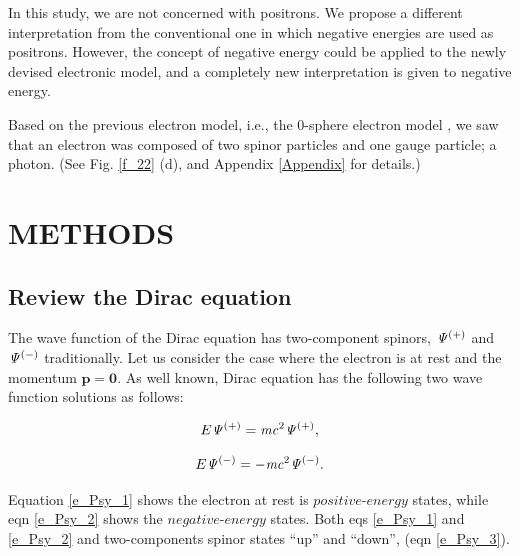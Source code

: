 \documentclass[%
 reprint,
 amsmath,amssymb,
 aps,
]{revtex4-1}
\numberwithin{equation}{section}%
\begin{document}
    
    In this study, we are not concerned with positrons. We propose a different interpretation from the conventional one in which negative energies are used as positrons. However, the concept of negative energy could be applied to the newly devised electronic model, and a completely new interpretation is given to negative energy.

    Based on the previous electron model, i.e., the 0-sphere electron model \cite{Hanamura1} \cite{Hanamura6}, we saw that an electron was composed of two spinor particles and one gauge particle; a photon. (See Fig. \ref{f_22} ($\bm{\mathrm{d}}$), and Appendix \ref{Appendix} for details.)
    




\section{\label{sec:METHODS}METHODS}



\subsection{
    \label{sec:Review the Dirac equation}
        Review the Dirac equation}


    The wave function of the Dirac equation has two-component spinors, $\it \Psi^{(+)}$ and $\it \Psi^{(-)}$ traditionally. Let us consider the case where the electron is at rest and the momentum $ \bm{p} = \bm{0} $. As well known, Dirac equation has the following two wave function solutions as follows:

        \begin{equation}
            E \it\Psi^{(+)} = m c^{\mathrm{2}} \it\Psi^{(+)}
            \\,
            \label{e_Psy_1}
        \end{equation}

        \begin{equation}
            E \it\Psi^{(-)} = - m c^{\mathrm{2}} \it\Psi^{(-)}
            \\.
            \label{e_Psy_2}
        \end{equation}

    Equation \ref{e_Psy_1} shows the electron at rest is $positive$-$energy$ states, while eqn \ref{e_Psy_2} shows the $negative$-$energy$ states. Both eqs \ref{e_Psy_1} and \ref{e_Psy_2} and two-components spinor states ``up'' and ``down'', (eqn \ref{e_Psy_3}).
\end{document}
